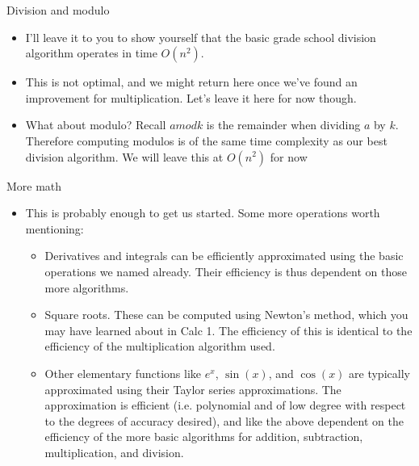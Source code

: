 \documentclass{beamer}
\begin{document}
\begin{frame}[fragile]{Division and modulo}
    \begin{itemize}
        \item I'll leave it to you to show yourself that the basic grade school division algorithm operates in time $O(n^2)$. 
        \item This is not optimal, and we might return here once we've found an improvement for multiplication. Let's leave it here for now though.
        \item What about modulo? Recall $a mod k$ is the remainder when dividing $a$ by $k$. Therefore computing modulos is of the same time complexity as our best division algorithm. We will leave this at $O(n^2)$ for now
    \end{itemize}
\end{frame}

\begin{frame}{More math}
    \begin{itemize}
        \item This is probably enough to get us started. Some more operations worth mentioning:
        \begin{itemize}
            \pause
            \item Derivatives and integrals can be efficiently approximated using the basic operations we named already. Their efficiency is thus dependent on those more algorithms. 
            \pause
            \item Square roots. These can be computed using Newton's method, which you may have learned about in Calc 1. The efficiency of this is identical to the efficiency of the multiplication algorithm used.
            \pause
            \item Other elementary functions like $e^x$, $\sin(x)$, and $\cos(x)$ are typically approximated using their Taylor series approximations. The approximation is efficient (i.e. polynomial and of low degree with respect to the degrees of accuracy desired), and like the above dependent on the efficiency of the more basic algorithms for addition, subtraction, multiplication, and division. 
        \end{itemize}
    \end{itemize}
\end{frame}
\end{document}

